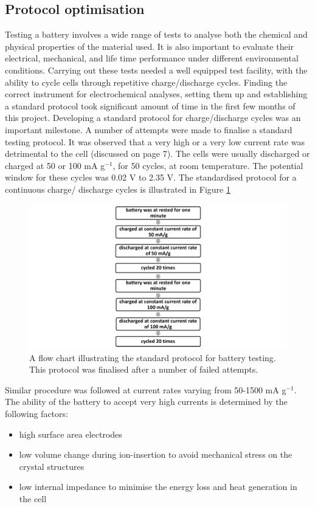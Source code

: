 \subsection*{Protocol optimisation}
Testing a battery involves a wide range of tests to analyse both the chemical and physical properties of the material used. It is also important to evaluate their electrical, mechanical, and life time performance under different environmental conditions.
Carrying out these tests needed a well equipped test facility, with the ability to cycle cells through repetitive charge/discharge cycles. Finding the correct instrument for electrochemical analyses, setting them up and establishing a standard protocol took significant amount of time in the first few months of this project. Developing a standard protocol for charge/discharge cycles was an important milestone. A number of attempts were made to finalise a standard testing protocol. It was observed that a very high or a very low current rate was detrimental to the cell (discussed on page 7). The cells were usually discharged or charged at 50 or 100 mA g$^{-1}$, for 50 cycles, at room temperature. The potential window for these cycles was 0.02 V to 2.35 V. 
The standardised protocol for a continuous charge/ discharge cycles is illustrated in Figure \ref{Figures/chap3fig:flow}

\begin{figure}[tbh!]
\centering
\includegraphics[width=\textwidth]{Figures/chap3fig/flow.pdf}
\caption{A flow chart illustrating the standard protocol for battery testing. This protocol was finalised after a number of failed attempts.}
\label{Figures/chap3fig:flow}
\end{figure}

Similar procedure was followed at current rates varying from 50-1500 mA g$^{-1}$.\\
The ability of the battery to accept very high currents is determined by the following factors:
\begin{itemize}
    \item high surface area electrodes
    \item low volume change during ion-insertion to avoid mechanical stress on the crystal structures
    \item low internal impedance to minimise the energy loss and heat generation in the cell
\end{itemize}

